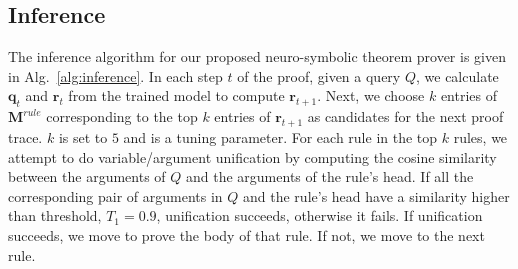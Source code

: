 

\subsection*{Inference} The inference algorithm for our proposed neuro-symbolic theorem prover is given in Alg.~\ref{alg:inference}.
In each step $t$ of the proof, given a query $Q$, we calculate $\mathbf{q}_t$
and $\mathbf{r}_t$ from the trained model to compute $\mathbf{r}_{t+1}$. Next, we choose $k$ entries of $\mathbf{M}^{rule}$ corresponding to the top $k$ entries of $\mathbf{r}_{t+1}$ as candidates for the next proof trace. $k$ is set to $5$ and is a tuning parameter. For each rule in the top $k$ rules, we attempt to do variable/argument unification by computing the cosine similarity between the arguments of $Q$ and the arguments of the rule's head. If all the corresponding pair of arguments in $Q$ and the rule's head have a similarity higher than threshold, $T_1=0.9$, unification succeeds, otherwise it fails. %
If unification succeeds, we move to prove the body of that rule. If not, we move to the next rule. %
